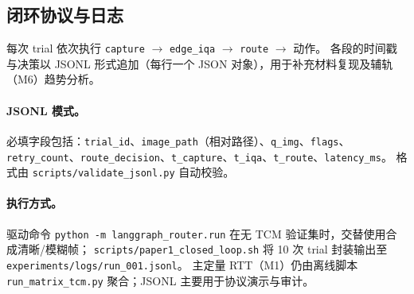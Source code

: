\subsection{闭环协议与日志}
\label{sec:closed-loop-zh}

每次 trial 依次执行 \texttt{capture} $\rightarrow$ \texttt{edge\_iqa} $\rightarrow$ \texttt{route} $\rightarrow$ 动作。
各段的时间戳与决策以 JSONL 形式追加（每行一个 JSON 对象），用于补充材料复现及辅轨（M6）趋势分析。

\paragraph{JSONL 模式。}
必填字段包括：\texttt{trial\_id}、\texttt{image\_path}（相对路径）、\texttt{q\_img}、\texttt{flags}、\texttt{retry\_count}、\texttt{route\_decision}、\texttt{t\_capture}、\texttt{t\_iqa}、\texttt{t\_route}、\texttt{latency\_ms}。
格式由 \texttt{scripts/validate\_jsonl.py} 自动校验。

\paragraph{执行方式。}
驱动命令 \texttt{python -m langgraph\_router.run} 在无 TCM 验证集时，交替使用合成清晰/模糊帧；
\texttt{scripts/paper1\_closed\_loop.sh} 将 10 次 trial 封装输出至 \texttt{experiments/logs/run\_001.jsonl}。
主定量 RTT（M1）仍由离线脚本 \texttt{run\_matrix\_tcm.py} 聚合；JSONL 主要用于协议演示与审计。

\begin{table}[t]
\centering
\caption{Paper~I 闭环 JSONL 字段。}
\small
{}
\end{table}
